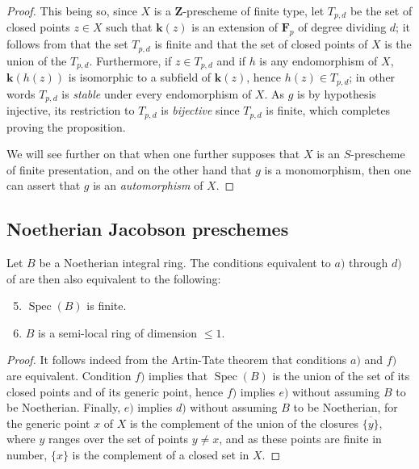 \begin{proof}
This being so, since $X$ is a $\mathbf{Z}$-prescheme of finite type, let $T_{p,d}$ be the set of closed points $z\in X$ such that $\boldsymbol{k}(z)$ is an extension of $\mathbf{F}_p$ of degree dividing $d$; it follows from  that the set $T_{p,d}$ is finite and that the set of closed points of $X$ is the union of the $T_{p,d}$.
Furthermore, if $z\in T_{p,d}$ and if $h$ is any endomorphism of $X$, $\boldsymbol{k}(h(z))$ is isomorphic to a subfield of $\boldsymbol{k}(z)$, hence $h(z)\in T_{p,d}$; in other words $T_{p,d}$ is \emph{stable} under every endomorphism of $X$.
As $g$ is by hypothesis injective, its restriction to $T_{p,d}$ is \emph{bijective} since $T_{p,d}$ is finite, which completes proving the proposition.

We will see further on  that when one further supposes that $X$ is an $S$-prescheme of finite presentation, and on the other hand that $g$ is a monomorphism, then one can assert that $g$ is an \emph{automorphism} of $X$.
\end{proof}

\subsection{Noetherian Jacobson preschemes}
\label{subsection:IV.10.5}

\begin{proposition}[10.5.1]
\label{IV.10.5.1}
Let $B$ be a Noetherian integral ring.
The conditions equivalent to $a)$ through $d)$ of  are then also equivalent to the following:
\begin{enumerate}[label=\alph*)]
  \setcounter{enumi}{4}
  \item $\operatorname{Spec}(B)$ is finite.
  \item $B$ is a semi-local ring of dimension $\leq 1$.
\end{enumerate}
\end{proposition}

\begin{proof}
It follows indeed from the Artin-Tate theorem  that conditions $a)$ and $f)$ are equivalent.
Condition $f)$ implies that $\operatorname{Spec}(B)$ is the union of the set of its closed points and of its generic point, hence $f)$ implies $e)$ without assuming $B$ to be Noetherian.
Finally, $e)$ implies $d)$ without assuming $B$ to be Noetherian, for the generic point $x$ of $X$ is the complement of the union of the closures $\overline{\{y\}}$, where $y$ ranges over the set of points $y\neq x$, and as these points are finite in number, $\{x\}$ is the complement of a closed set in $X$.
\end{proof}

